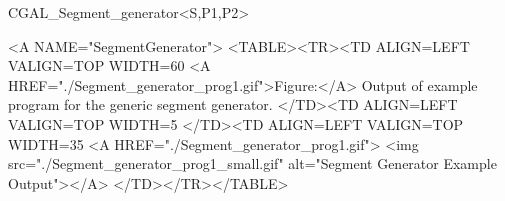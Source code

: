 \begin{ccClassTemplate}{CGAL_Segment_generator<S,P1,P2>}

\begin{ccHtmlOnly}
  <A NAME="SegmentGenerator">
  <TABLE><TR><TD ALIGN=LEFT VALIGN=TOP WIDTH=60%
    <A HREF="./Segment_generator_prog1.gif">Figure:</A>
    Output of example program for the generic segment generator.
  </TD><TD ALIGN=LEFT VALIGN=TOP WIDTH=5%
  </TD><TD ALIGN=LEFT VALIGN=TOP WIDTH=35%
    <A HREF="./Segment_generator_prog1.gif">
        <img src="./Segment_generator_prog1_small.gif" 
             alt="Segment Generator Example Output"></A>
  </TD></TR></TABLE>
\end{ccHtmlOnly}

\end{ccClassTemplate}

\beforecprogskip\parskip
{}

